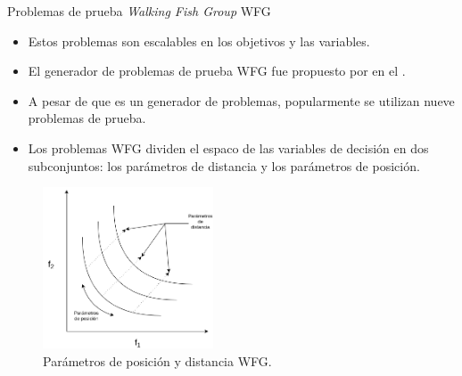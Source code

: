 \documentclass{beamer}
\begin{document}
\begin{frame}{Problemas de prueba \textit{Walking Fish Group} WFG}
\begin{itemize}
\scriptsize
   \item Estos problemas son escalables en los objetivos y las variables.
   \item El generador de problemas de prueba WFG fue propuesto por \citeauthor{Joel:WFG} en el \citeyear{Joel:WFG}.
   \item A pesar de que es un generador de problemas, popularmente se utilizan nueve problemas de prueba.
   \item Los problemas WFG dividen el espaco de las variables de decisión en dos subconjuntos: los parámetros de distancia y los parámetros de posición.
\end{itemize}
\begin{figure}[H]
\includegraphics[width=0.45\textwidth]{pos_dist.png}
\centering
\caption{\scriptsize Parámetros de posición y distancia WFG.}
\end{figure}
\end{frame}
\end{document}
